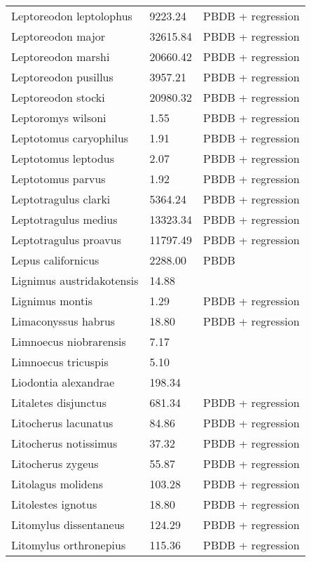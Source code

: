 \documentclass{article}
\begin{document}
\begin{center}
\begin{longtable}{p{} p{} p{}}
    Leptoreodon leptolophus & 9223.24 & PBDB + regression \\ 
    Leptoreodon major & 32615.84 & PBDB + regression \\ 
    Leptoreodon marshi & 20660.42 & PBDB + regression \\ 
    Leptoreodon pusillus & 3957.21 & PBDB + regression \\ 
    Leptoreodon stocki & 20980.32 & PBDB + regression \\ 
    Leptoromys wilsoni & 1.55 & PBDB + regression \\ 
    Leptotomus caryophilus & 1.91 & PBDB + regression \\ 
    Leptotomus leptodus & 2.07 & PBDB + regression \\ 
    Leptotomus parvus & 1.92 & PBDB + regression \\ 
    Leptotragulus clarki & 5364.24 & PBDB + regression \\ 
    Leptotragulus medius & 13323.34 & PBDB + regression \\ 
    Leptotragulus proavus & 11797.49 & PBDB + regression \\ 
    Lepus californicus & 2288.00 & PBDB \\ 
    Lignimus austridakotensis & 14.88 & \cite{Tomiya2013} \\ 
    Lignimus montis & 1.29 & PBDB + regression \\ 
    Limaconyssus habrus & 18.80 & PBDB + regression \\ 
    Limnoecus niobrarensis & 7.17 & \cite{Tomiya2013} \\ 
    Limnoecus tricuspis & 5.10 & \cite{Tomiya2013} \\ 
    Liodontia alexandrae & 198.34 & \cite{Tomiya2013} \\ 
    Litaletes disjunctus & 681.34 & PBDB + regression \\ 
    Litocherus lacunatus & 84.86 & PBDB + regression \\ 
    Litocherus notissimus & 37.32 & PBDB + regression \\ 
    Litocherus zygeus & 55.87 & PBDB + regression \\ 
    Litolagus molidens & 103.28 & PBDB + regression \\ 
    Litolestes ignotus & 18.80 & PBDB + regression \\ 
    Litomylus dissentaneus & 124.29 & PBDB + regression \\ 
    Litomylus orthronepius & 115.36 & PBDB + regression \\ 

\end{longtable}
\end{center}
\end{document}
